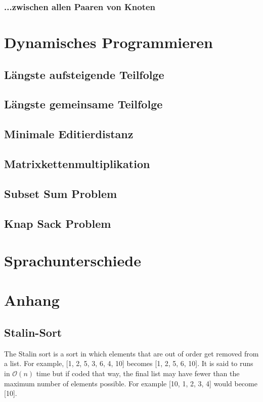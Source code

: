 \documentclass[a4paper]{article}
\begin{document}
\subsubsection{...zwischen allen Paaren von Knoten}
    
    
\section{Dynamisches Programmieren}

\subsection{Längste aufsteigende Teilfolge}

\subsection{Längste gemeinsame Teilfolge}

\subsection{Minimale Editierdistanz}

\subsection{Matrixkettenmultiplikation}

\subsection{Subset Sum Problem}

\subsection{Knap Sack Problem}





\section{Sprachunterschiede}


\newpage
\section{Anhang}
\subsection{Stalin-Sort}
The Stalin sort is a sort in which elements that are out of order get removed from a list. For example, [1, 2, 5, 3, 6, 4, 10] becomes [1, 2, 5, 6, 10]. It is said to runs in $\mathcal{O}(n)$ time but if coded that way, the final list may have fewer than the maximum number of elements possible. For example [10, 1, 2, 3, 4] would become [10].
\end{document}
